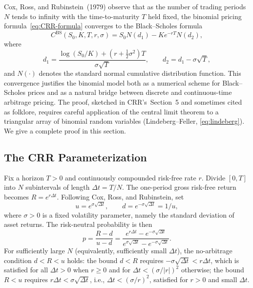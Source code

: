 \documentclass[11pt,a4paper]{article}
\theoremstyle{plain}
\theoremstyle{definition}
\begin{document}
Cox, Ross, and Rubinstein~(1979) observe that as the number of trading
periods $N$ tends to infinity with the time-to-maturity $T$ held fixed,
the binomial pricing formula~\eqref{eq:CRR-formula} converges to the
Black--Scholes formula
\begin{equation}
    \label{eq:black-scholes}
    C^{\mathrm{BS}}(S_0, K, T, r, \sigma)
    = S_0 N(d_1) - K e^{-rT} N(d_2),
\end{equation}
where
\begin{equation}
    \label{eq:d1-d2}
    d_1 = \frac{\log(S_0 / K) + (r + \tfrac{1}{2}\sigma^2)T}{\sigma\sqrt{T}},
    \qquad d_2 = d_1 - \sigma\sqrt{T},
\end{equation}
and $N(\cdot)$ denotes the standard normal cumulative distribution
function. This convergence justifies the binomial model both as a
numerical scheme for Black--Scholes prices and as a natural bridge
between discrete and continuous-time arbitrage pricing. The proof,
sketched in CRR's~Section~5 and sometimes cited as folklore, requires
careful application of the central limit theorem to a triangular array
of binomial random variables (Lindeberg--Feller, \eqref{eq:lindeberg}). We give a complete proof in this section.

\subsection{The CRR Parameterization}
\label{subsec:crr-param}

Fix a horizon $T > 0$ and continuously compounded risk-free rate $r$.
Divide $[0, T]$ into $N$ subintervals of length $\Delta t = T / N$. The
one-period gross risk-free return becomes $R = e^{r \Delta t}$. Following
Cox, Ross, and Rubinstein, set
\begin{equation}
    \label{eq:crr-uvd}
    u = e^{\sigma \sqrt{\Delta t}}, \qquad d = e^{-\sigma \sqrt{\Delta t}} = 1/u,
\end{equation}
where $\sigma > 0$ is a fixed volatility parameter, namely the standard deviation of asset returns. The risk-neutral
probability is then
\begin{equation}
    \label{eq:crr-p}
    p = \frac{R - d}{u - d}
      = \frac{e^{r \Delta t} - e^{-\sigma\sqrt{\Delta t}}}
             {e^{\sigma\sqrt{\Delta t}} - e^{-\sigma\sqrt{\Delta t}}}.
\end{equation}
For sufficiently large $N$ (equivalently, sufficiently small $\Delta t$),
the no-arbitrage condition $d < R < u$ holds: the bound $d < R$ requires
$-\sigma \sqrt{\Delta t} < r \Delta t$, which is satisfied for all
$\Delta t > 0$ when $r \geq 0$ and for $\Delta t < (\sigma/|r|)^2$
otherwise; the bound $R < u$ requires $r \Delta t < \sigma \sqrt{\Delta t}$,
i.e., $\Delta t < (\sigma/r)^2$, satisfied for $r > 0$ and small
$\Delta t$.
\end{document}

